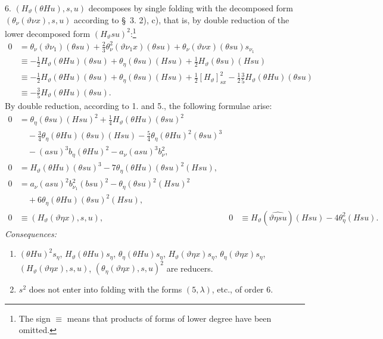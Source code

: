 \documentclass[11pt]{article}
\begin{document}
6. $(H_\vartheta(\theta Hu),s,u)$ decomposes by single folding with the decomposed form $(\theta_\nu(\vartheta\nu x),s,u)$ according to \S\ 3. 2), c), that is, by double reduction of the lower decomposed form $(H_\vartheta su)^2$:\footnote{The sign $\equiv$ means that products of forms of lower degree have been omitted.}
\begin{align*}
0&=\theta_\nu(\vartheta\nu_1)(\theta su)+\frac23\theta_\nu^2(\vartheta\nu_1x)(\theta su)+\theta_\nu(\vartheta\nu x)(\theta su)s_{\nu_1}\\
&\equiv -\frac12H_\vartheta(\theta Hu)(\theta su)+\theta_\eta(\theta su)(Hsu)+\frac12H_\vartheta(\theta su)(Hsu)\\
&\equiv -\frac12H_\vartheta(\theta Hu)(\theta su)+\theta_\eta(\theta su)(Hsu)+\frac12[H_\vartheta]_{sx}^2-\frac12\frac35H_\vartheta(\theta Hu)(\theta su)\\
&\equiv -\frac35H_\vartheta(\theta Hu)(\theta su).
\end{align*}
By double reduction, according to 1. and 5., the following formulae arise:
\begin{equation}
\tag{31}
\begin{aligned}
0&=\theta_\eta(\theta su)(Hsu)^2+\frac14H_\vartheta(\theta Hu)(\theta su)^2\\
&\quad-\frac34\theta_\eta(\theta Hu)(\theta su)(Hsu)-\frac54\theta_\eta(\theta Hu)^2(\theta su)^3\\
&\quad-(asu)^3b_\eta(\theta Hu)^2-a_\nu(asu)^3b_\nu^2,\\
0&=H_\vartheta(\theta Hu)(\theta su)^3-7\theta_\eta(\theta Hu)(\theta su)^2(Hsu),\\
0&=a_\nu(asu)^2b_{\nu_1}^{2}(bsu)^2-\theta_\eta(\theta su)^2(Hsu)^2\\
&\quad+6\theta_\eta(\theta Hu)(\theta su)^2(Hsu),\\
0&\equiv (H_\vartheta(\vartheta\eta x),s,u),
&0&\equiv H_\vartheta(\widehat{\vartheta\eta su})(Hsu)-4\theta_\eta^2(Hsu).
\end{aligned}
\end{equation}
\noindent\emph{Consequences:}
\begin{enumerate}
\item $(\theta Hu)^2s_\eta$, $H_\vartheta(\theta Hu)s_\eta$, $\theta_\eta(\theta Hu)s_\eta$, $H_\vartheta(\vartheta\eta x)s_\eta$, $\theta_\eta(\vartheta\eta x)s_\eta$, $(H_\vartheta(\vartheta\eta x),s,u)$, $(\theta_\eta(\vartheta\eta x),s,u)^2$ are reducers.
\item $s^2$ does not enter into folding with the forms $(5,\lambda)$, etc., of order 6.
\end{enumerate}
\end{document}
